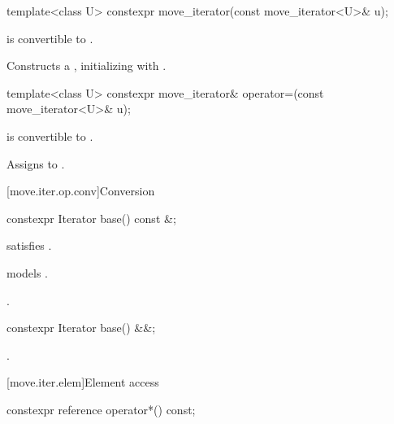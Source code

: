 %
\begin{itemdecl}
template<class U> constexpr move_iterator(const move_iterator<U>& u);
\end{itemdecl}

\begin{itemdescr}
\pnum
\mandates
{} is convertible to .

\pnum
\effects
Constructs a , initializing
 with .
\end{itemdescr}

%
\begin{itemdecl}
template<class U> constexpr move_iterator& operator=(const move_iterator<U>& u);
\end{itemdecl}

\begin{itemdescr}
\pnum
\mandates
{} is convertible to .

\pnum
\effects
Assigns  to
.
\end{itemdescr}

[move.iter.op.conv]{Conversion}

%
\begin{itemdecl}
constexpr Iterator base() const &;
\end{itemdecl}

\begin{itemdescr}
\pnum
\constraints {} satisfies .

\pnum
\expects
{} models .

\pnum
\returns
{}.
\end{itemdescr}

%
\begin{itemdecl}
constexpr Iterator base() &&;
\end{itemdecl}

\begin{itemdescr}
\pnum
\returns
{}.
\end{itemdescr}

[move.iter.elem]{Element access}

%
\begin{itemdecl}
constexpr reference operator*() const;
\end{itemdecl}

